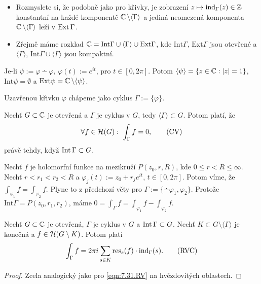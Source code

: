 \begin{note}
\begin{itemize}
    \item Rozmyslete si, že podobně jako pro křivky, je zobrazení $z\mapsto\operatorname{ind}_\Gamma(z)\in\operatorname{\mathbb{Z}}$ konstantní na každé komponentě $\operatorname{\mathbb{C}} \setminus\langle\Gamma\rangle$ a jediná neomezená komponenta $\operatorname{\mathbb{C}} \setminus\langle\Gamma\rangle$ leží v $\operatorname{Ext}\Gamma$.
    \item Zřejmě máme rozklad $\operatorname{\mathbb{C}} =\text{Int}\Gamma\cup\langle\Gamma\rangle\cup\text{Ext} \Gamma$, kde $\text{Int} \Gamma$, $\text{Ext} \Gamma$ jsou otevřené a $\langle\Gamma\rangle$, $\text{Int} \Gamma\cup\langle\Gamma\rangle$ jsou kompaktní.
\end{itemize}
\end{note}

\begin{example}
Je-li $\psi:=\varphi\dotminus\varphi$, $\varphi(t):=e^{it}$, pro $t\in[0,2\pi]$. Potom $\langle\psi\rangle=\{z\in\operatorname{\mathbb{C}} : |z|=1\}$, $\text{Int}\psi=\emptyset$ a $\text{Ext}\psi=\operatorname{\mathbb{C}} \setminus\langle\psi\rangle$.
\end{example}

\begin{note}
Uzavřenou křivku $\varphi$ chápeme jako cyklus $\Gamma:=\{\varphi\}$.
\end{note}

\begin{theorem}\label{thm:obCapC}
Nechť $G\subset\operatorname{\mathbb{C}} $ je otevřená a $\Gamma$ je cyklus v $G$, tedy $\langle\Gamma\rangle\subset G$. Potom platí, že
\begin{equation}
    \forall f\in\Holo(G):\ \int_\Gamma f =0,
    \tag{CV}
    \label{eqn:7.30.cv}
\end{equation}
právě tehdy, když $\operatorname{Int}\Gamma\subset G$.
\end{theorem}

\begin{example}
Nechť $f$ je holomorfní funkce na mezikruží $P(z_0,r,R)$, kde $0\leq r<R\leq\infty$. Nechť $r<r_1<r_2<R$ a $\varphi_j(t):=z_0+r_je^{it}$, $t\in[0,2\pi]$. Potom víme, že $\int_{\varphi_1}f=\int_{\varphi_2}f$. Plyne to z předchozí věty pro $\Gamma:=\{\dotminus\varphi_1,\varphi_2\}$. Protože $\text{Int}\Gamma=P(z_0,r_1,r_2)$, máme $0=\int_\Gamma f = \int_{\varphi_1}f-\int_{\varphi_2}f$.
\end{example}

\begin{theorem}
Nechť $G\subset\operatorname{\mathbb{C}}$ je otevřená, $\Gamma$ je cyklus v $G$ a $\operatorname{Int}\Gamma\subset G$. Nechť $K\subset G\setminus\langle\Gamma\rangle$ je konečná  a $f\in\operatorname{\mathcal{H}}(G\setminus K)$. Potom platí
\begin{equation}
    \int_\Gamma f = 2\pi i  \sum_{s\in K}\text{res}_s(f)\cdot\operatorname{ind}_\Gamma(s).
    \tag{RVC}
    \label{eqn:9.8.rvc}
\end{equation}
\end{theorem}
\begin{proof}
Zcela analogický jako pro \cref{eqn:7.31.RV} na hvězdovitých oblastech.
\end{proof}
